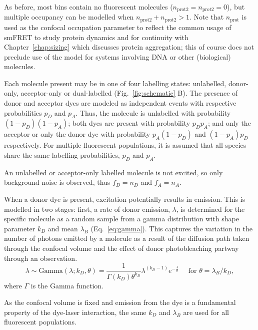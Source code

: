As before, most bins contain no fluorescent molecules ($n_{\text{prot2}} = n_{\text{prot2}} = 0$), but multiple occupancy can be modelled when $n_{\text{prot2}} + n_{\text{prot2}} >1$. Note that $n_{\text{prot}}$ is used as the confocal occupation parameter to reflect the common usage of smFRET to study protein dynamics and for continuity with Chapter~\ref{chap:sizing} which discusses protein aggregation; this of course does not preclude use of the model for systems involving DNA or other (biological) molecules.

Each molecule present may be in one of four labelling states: unlabelled, donor-only, acceptor-only or dual-labelled (Fig.~\ref{fig:schematic} B). The presence of donor and acceptor dyes are modeled as independent events with respective probabilities $p_D$ and $p_A$. Thus, the molecule is unlabelled with probability $(1-p_D)(1-p_A)$; both dyes are present with probability $p_D p_A$; and only the acceptor or only the donor dye with probability $p_A (1-p_D)$ and $(1-p_A)p_D$ respectively. For multiple fluorescent populations, it is assumed that all species share the same labelling probabilities, $p_D$ and $p_A$. 

An unlabelled or acceptor-only labelled molecule is not excited, so only background noise is observed, thus $f_D = n_D$ and $f_A = n_A$.

When a donor dye is present, excitation potentially results in emission. This is modelled in two stages: first, a rate of donor emission, $\lambda$, is determined for the specific molecule as a random sample from a gamma distribution with shape parameter $k_D$ and mean $\lambda_B$ (Eq.~\ref{eq:gamma}). This captures the variation in the number of photons emitted by a molecule as a result of the diffusion path taken through the confocal volume and the effect of donor photobleaching partway through an observation.
\begin{equation}
\lambda \sim \text{Gamma}(\lambda; k_D, \theta) =  \frac{1}{\Gamma(k_D) \theta^{k_D}} \lambda^{(k_D - 1)} e^{-\frac{\lambda}{\theta}} \quad\text{ for } \theta = \lambda_B / k_D ,
\label{eq:gamma}
\end{equation} 
where $\Gamma$ is the Gamma function. 

As the confocal volume is fixed and emission from the dye is a fundamental property of the dye-laser interaction, the same $k_D$ and $\lambda_B$ are used for all fluorescent populations. 

